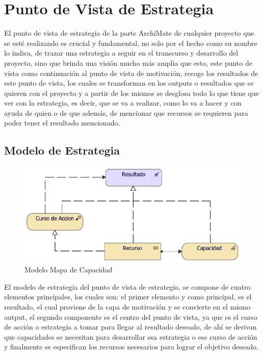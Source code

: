 \section{Punto de Vista de Estrategia}

El punto de vista de estrategia de la parte ArchiMate de cualquier proyecto que se esté realizando es crucial y fundamental, no solo por el hecho como su nombre lo indica, de trazar una estrategia a seguir en el transcurso y desarrollo del proyecto, sino que brinda una visión mucho más amplia que esto, este punto de vista como continuación al punto de vista de motivación, recoge los resultados de este punto de vista, los cuales se transforman en los outputs o resultados que se quieren con el proyecto y a partir de los mismos se desglosa todo lo que tiene que ver con la estrategia, es decir, que se va a realizar, como lo va a hacer y con ayuda de quien o de que además, de mencionar que recursos se requieren para poder tener el resultado mencionado.

\subsection{Modelo de Estrategia}
\begin{figure}[h!]
	\centering
	\includegraphics[width=.8\linewidth]{imgs/caso/Estrategia}
	\caption{Modelo Mapa de Capacidad}
\end{figure}

El modelo de estrategia del punto de vista de estrategia, se compone de cuatro elementos principales, los cuales son: el primer elemento y como principal, es el resultado, el cual proviene de la capa de motivación y se convierte en el mismo output, el segundo componente es el centro del punto de vista, ya que es el curso de acción o estrategia a tomar para llegar al resultado deseado, de ahí se derivan que capacidades se necesitan para desarrollar esa estrategia o ese curso de acción y finalmente se especifican los recursos necesarios para lograr el objetivo deseado.

\newpage

